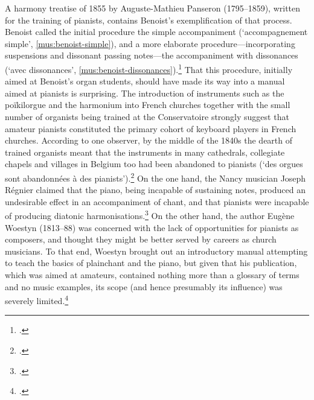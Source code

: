 A harmony treatise of 1855 by Auguste-Mathieu Panseron (1795--1859), written for the training of pianists, contains Benoist's exemplification of that process.
Benoist called the initial procedure the simple accompaniment (`accompagnement simple', \cref{mus:benoist-simple}), and a more elaborate procedure---incorporating suspensions and dissonant passing notes---the accompaniment with dissonances (`avec dissonances', \cref{mus:benoist-dissonances}).\footcites[251]{PanseronTraiteharmoniepratique1855}[41]{Nisardvraisprincipesaccompagnement1860}
That this procedure, initially aimed at Benoist's organ students, should have made its way into a manual aimed at pianists is surprising.
The introduction of instruments such as the poïkilorgue and the harmonium into French churches together with the small number of organists being trained at the Conservatoire strongly suggest that amateur pianists constituted the primary cohort of keyboard players in French churches.
According to one observer, by the middle of the 1840s the dearth of trained organists meant that the instruments in many cathedrals, collegiate chapels and villages in Belgium too had been abandoned to pianists (`des orgues sont abandonnées à des pianists').\footcite[206]{Janssenvraisprincipeschant1845}
On the one hand, the Nancy musician Joseph Régnier claimed that the piano, being incapable of sustaining notes, produced an undesirable effect in an accompaniment of chant, and that pianists were incapable of producing diatonic harmonisations.\footcite[403]{Regnierorguesaconnaissance1850}
%
On the other hand, the author Eugène Woestyn (1813--88) was concerned with the lack of opportunities for pianists as composers, and thought they might be better served by careers as church musicians.
To that end, Woestyn brought out an introductory manual attempting to teach the basics of plainchant and the piano, but given that his publication, which was aimed at amateurs, contained nothing more than a glossary of terms and no music examples, its scope (and hence presumably its influence) was severely limited.\footcite[13]{Woestynlivrepianisteplainchant1852}

